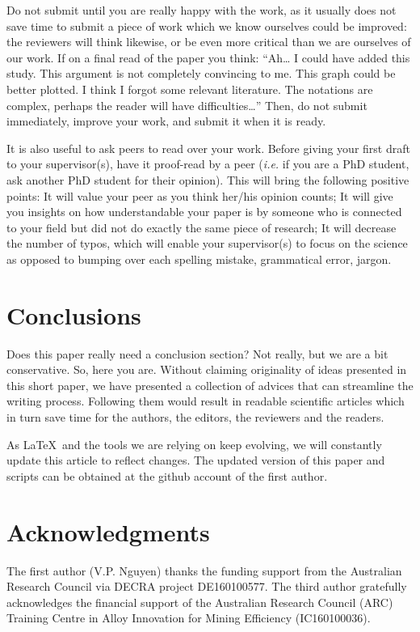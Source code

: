 \documentclass[authoryear,3p,times,preprint,review,fleqn]{elsarticle}
\numberwithin{equation}{section}
\theoremstyle{remark}
\begin{document}
Do not submit until you are really happy with the work, as it usually does not save time to submit a piece of work which we know ourselves could be improved: the reviewers will think likewise, or be even more critical than we are ourselves of our work. If on a final read of the paper you think: “Ah… I could have added this study. This argument is not completely convincing to me. This graph could be better plotted. I think I forgot some relevant literature. The notations are complex, perhaps the reader will have difficulties…” Then, do not submit immediately, improve your work, and submit it when it is ready. 

It is also useful to ask peers to read over your work. Before giving your first draft to your supervisor(s), have it proof-read by a peer (\textit{i.e.} if you are a PhD student, ask another PhD student for their opinion). This will bring the following positive points: 
It will value your peer as you think her/his opinion counts;
It will give you insights on how understandable your paper is by someone who is connected to your field but did not do exactly the same piece of research;
It will decrease the number of typos, which will enable your supervisor(s) to focus on the science as opposed to bumping over each spelling mistake, grammatical error, jargon.


\section{Conclusions}

Does this paper really need a conclusion section? Not really, but we are a bit conservative. So, here you are. Without claiming  originality of ideas presented in this short paper, we have presented a collection of  advices that can streamline the writing process. Following them would result in readable scientific articles which in turn save time for the authors,  the editors, the reviewers and the readers.

As \LaTeX\ and the tools we are relying on keep evolving, we will constantly update this article to reflect changes. The updated version of this paper and scripts can be obtained at the github account of the first author.

%
\section*{Acknowledgments}

 The first author (V.P. Nguyen) thanks the funding support from the Australian Research Council via DECRA project DE160100577.  The third  author gratefully acknowledges the financial support of the Australian Research Council (ARC) Training Centre in Alloy Innovation for Mining Efficiency (IC160100036).
\end{document}
